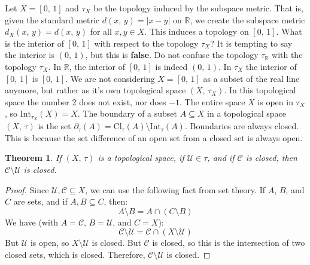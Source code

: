 \documentclass{article}
\theoremstyle{plain}
\newtheorem{theorem}{Theorem}[section]
\theoremstyle{normal}
\newenvironment{example}{%
    \pushQED{\qed}\renewcommand{\qedsymbol}{$\blacksquare$}\examplex%
}{%
    \popQED\endexamplex%
}
\newenvironment{definition}{%
    \pushQED{\qed}\renewcommand{\qedsymbol}{$\blacksquare$}\definitionx%
}{%
    \popQED\enddefinitionx%
}
\begin{document}
        \begin{example}
            Let $X=[0,\,1]$ and $\tau_{X}$ be the topology induced by the
            subspace metric. That is, given the standard metric
            $d(x,\,y)=|x-y|$ on $\mathbb{R}$, we create the subspace metric
            $d_{X}(x,\,y)=d(x,\,y)$ for all $x,y\in{X}$. This induces a topology
            on $[0,\,1]$. What is the interior of $[0,\,1]$ with respect
            to the topology $\tau_{X}$? It is tempting to say the interior
            is $(0,\,1)$, but this is \textbf{false}. Do not confuse the
            topology $\tau_{\mathbb{R}}$ with the topology
            $\tau_{X}$. In $\mathbb{R}$, the interior of $[0,\,1]$ is indeed
            $(0,\,1)$. In $\tau_{X}$ the interior of $[0,\,1]$ is
            $[0,\,1]$. We are not considering $X=[0,\,1]$ as a subset of the
            real line anymore, but rather as it's own topological space
            $(X,\,\tau_{X})$. In this topological space the number 2 does not
            exist, nor does $-1$. The entire space $X$ is open in $\tau_{X}$,
            so $\textrm{Int}_{\tau_{X}}(X)=X$.
        \end{example}
        \begin{definition}[\textbf{Topological Boundary}]
            The boundary of a subset $A\subseteq{X}$ in a topological space
            $(X,\,\tau)$ is the set
            $\partial_{\tau}(A)=\textrm{Cl}_{\tau}(A)\setminus\textrm{Int}_{\tau}(A)$.
        \end{definition}
        Boundaries are always closed. This is because the set difference of an
        open set from a closed set is always open.
        \begin{theorem}
            If $(X,\,\tau)$ is a topological space, if $\mathcal{U}\in\tau$,
            and if $\mathcal{C}$ is closed, then
            $\mathcal{C}\setminus\mathcal{U}$ is closed.
        \end{theorem}
        \begin{proof}
            Since $\mathcal{U},\mathcal{C}\subseteq{X}$, we can use the
            following fact from set theory. If $A$, $B$, and $C$ are sets,
            and if $A,B\subseteq{C}$, then:
            \begin{equation}
                A\setminus{B}=A\cap(C\setminus{B})
            \end{equation}
            We have (with $A=\mathcal{C}$, $B=\mathcal{U}$, and
            $C=X$):
            \begin{equation}
                \mathcal{C}\setminus\mathcal{U}
                =\mathcal{C}\cap(X\setminus\mathcal{U})
            \end{equation}
            But $\mathcal{U}$ is open, so $X\setminus\mathcal{U}$ is closed.
            But $\mathcal{C}$ is closed, so this is the intersection of two
            closed sets, which is closed. Therefore,
            $\mathcal{C}\setminus\mathcal{U}$ is closed.
        \end{proof}
\end{document}
